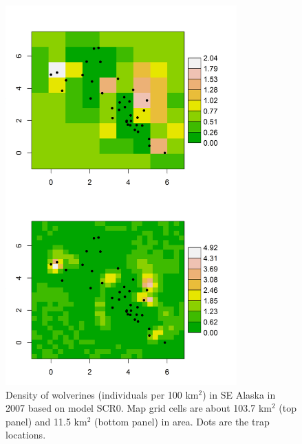 {\begin{figure}
\begin{center}
\includegraphics[height=5.75in,width=3.5in]{Ch5-SCR0/figs/wolvDensity}
\end{center}
\caption{Density of wolverines (individuals per 100 km$^2$) in SE Alaska in 2007 based on
  model SCR0. Map grid cells are about 103.7 km$^2$ (top panel) and
11.5 km$^2$ (bottom panel) in area. Dots are the trap locations.}
\label{scr0.fig.density}
\end{figure}



}
